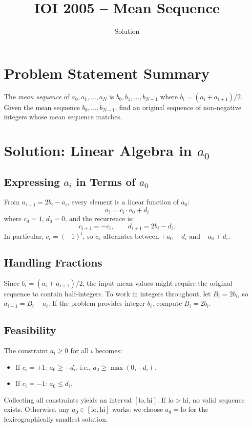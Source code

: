 \documentclass[11pt,a4paper]{article}
\title{IOI 2005 -- Mean Sequence}
\author{Solution}
\date{}
\begin{document}
\maketitle

\section{Problem Statement Summary}
The \emph{mean sequence} of $a_0, a_1, \ldots, a_N$ is
$b_0, b_1, \ldots, b_{N-1}$ where $b_i = (a_i + a_{i+1})/2$.
Given the mean sequence $b_0, \ldots, b_{N-1}$, find an original
sequence of non-negative integers whose mean sequence matches.

\section{Solution: Linear Algebra in $a_0$}

\subsection{Expressing $a_i$ in Terms of $a_0$}
From $a_{i+1} = 2b_i - a_i$, every element is a linear function of
$a_0$:
\[
  a_i = c_i \cdot a_0 + d_i
\]
where $c_0 = 1$, $d_0 = 0$, and the recurrence is:
\[
  c_{i+1} = -c_i, \qquad d_{i+1} = 2b_i - d_i.
\]
In particular, $c_i = (-1)^i$, so $a_i$ alternates between $+a_0 + d_i$
and $-a_0 + d_i$.

\subsection{Handling Fractions}
Since $b_i = (a_i + a_{i+1})/2$, the input mean values might require
the original sequence to contain half-integers. To work in integers
throughout, let $B_i = 2b_i$, so $a_{i+1} = B_i - a_i$. If the
problem provides integer $b_i$, compute $B_i = 2b_i$.

\subsection{Feasibility}
The constraint $a_i \ge 0$ for all $i$ becomes:
\begin{itemize}
  \item If $c_i = +1$: $a_0 \ge -d_i$, i.e., $a_0 \ge \max(0, -d_i)$.
  \item If $c_i = -1$: $a_0 \le d_i$.
\end{itemize}
Collecting all constraints yields an interval $[\mathrm{lo}, \mathrm{hi}]$.
If $\mathrm{lo} > \mathrm{hi}$, no valid sequence exists. Otherwise, any
$a_0 \in [\mathrm{lo}, \mathrm{hi}]$ works; we choose $a_0 = \mathrm{lo}$
for the lexicographically smallest solution.
\end{document}
